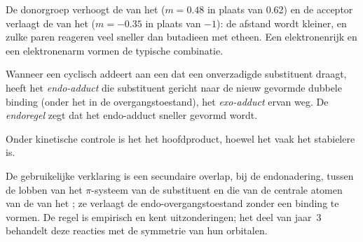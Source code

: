 De donorgroep verhoogt de  van het  ($m = 0.48$ in plaats van 0.62) en de acceptor
verlaagt de  van het  ($m = -0.35$ in plaats van $-1$): de afstand wordt kleiner, en zulke
paren reageren veel sneller dan butadieen met etheen. Een elektronenrijk  en een
elektronenarm  vormen de typische combinatie.

\begin{definition}\label{def:b2:frontier-orbitals:endo}
Wanneer een cyclisch  addeert aan een  dat een onverzadigde substituent draagt, heeft het
\emph{endo-adduct} die substituent gericht naar de nieuw
gevormde dubbele binding (onder het  in de overgangstoestand), het
\emph{exo-adduct} ervan weg. De \emph{endoregel} zegt
dat het endo-adduct sneller gevormd wordt.
\end{definition}

\begin{proposition}[De endoregel]\label{prop:b2:frontier-orbitals:endo}
Onder kinetische controle is het  het hoofdproduct, hoewel het 
vaak het stabielere is.
\end{proposition}

\admitted

De gebruikelijke verklaring is een secundaire overlap, bij de endonadering, tussen de
lobben van het $\pi$-systeem van de substituent en die van de centrale atomen van de  van
het ; ze verlaagt de endo-overgangstoestand zonder een binding te vormen. De regel is
empirisch en kent uitzonderingen; het deel van jaar~3 behandelt deze reacties met de
symmetrie van hun orbitalen.

